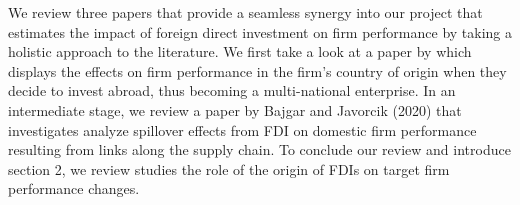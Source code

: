 We review three papers that provide a seamless synergy into our project that estimates the impact of foreign direct investment on firm performance by taking a holistic approach to the literature. We first take a look at a paper by \cite{borin2016foreign} which displays the effects on firm performance in the firm’s country of origin when they decide to invest abroad, thus becoming a multi-national enterprise. In an intermediate stage, we review a paper by Bajgar and Javorcik (2020)  that investigates analyze spillover effects from FDI on domestic firm performance resulting from links along the supply chain. To conclude our review and introduce section 2, we review \cite{chen2011} studies the role of the origin of FDIs on target firm performance changes. \\ \par

